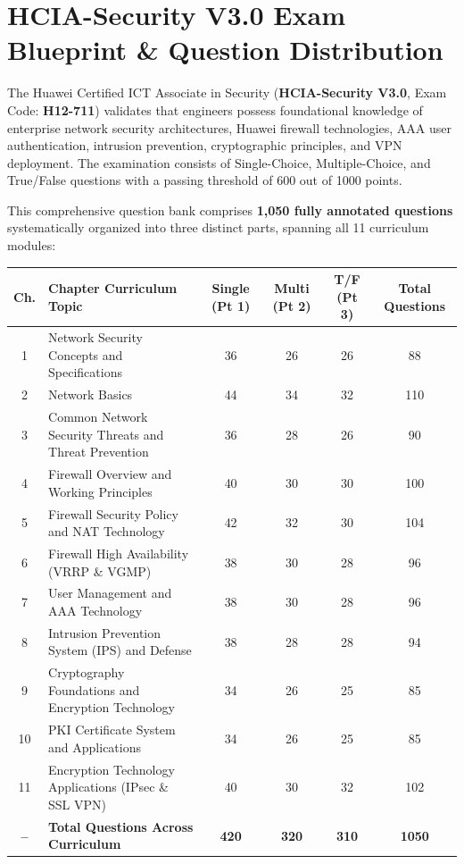 \section*{HCIA-Security V3.0 Exam Blueprint \& Question Distribution}

The Huawei Certified ICT Associate in Security (\textbf{HCIA-Security V3.0}, Exam Code: \textbf{H12-711}) validates that engineers possess foundational knowledge of enterprise network security architectures, Huawei firewall technologies, AAA user authentication, intrusion prevention, cryptographic principles, and VPN deployment. The examination consists of Single-Choice, Multiple-Choice, and True/False questions with a passing threshold of 600 out of 1000 points.

\vspace{0.8em}
\noindent This comprehensive question bank comprises \textbf{1,050 fully annotated questions} systematically organized into three distinct parts, spanning all 11 curriculum modules:

\begin{table}[h!]
\centering
\small
\begin{tabular}{cp{7.2cm}cccc}
\toprule
\textbf{Ch.} & \textbf{Chapter Curriculum Topic} & \textbf{Single (Pt 1)} & \textbf{Multi (Pt 2)} & \textbf{T/F (Pt 3)} & \textbf{Total Questions} \\
\midrule
1 & Network Security Concepts and Specifications & 36 & 26 & 26 & 88 \\
2 & Network Basics & 44 & 34 & 32 & 110 \\
3 & Common Network Security Threats and Threat Prevention & 36 & 28 & 26 & 90 \\
4 & Firewall Overview and Working Principles & 40 & 30 & 30 & 100 \\
5 & Firewall Security Policy and NAT Technology & 42 & 32 & 30 & 104 \\
6 & Firewall High Availability (VRRP \& VGMP) & 38 & 30 & 28 & 96 \\
7 & User Management and AAA Technology & 38 & 30 & 28 & 96 \\
8 & Intrusion Prevention System (IPS) and Defense & 38 & 28 & 28 & 94 \\
9 & Cryptography Foundations and Encryption Technology & 34 & 26 & 25 & 85 \\
10 & PKI Certificate System and Applications & 34 & 26 & 25 & 85 \\
11 & Encryption Technology Applications (IPsec \& SSL VPN) & 40 & 30 & 32 & 102 \\
\midrule
\textbf{--} & \textbf{Total Questions Across Curriculum} & \textbf{420} & \textbf{320} & \textbf{310} & \textbf{1050} \\
\bottomrule
\end{tabular}
\end{table}

